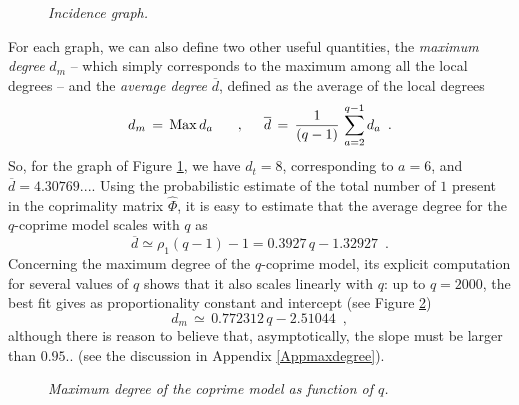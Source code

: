 \documentclass[aps,pra,superscriptaddress]{revtex4}
\newcommand\be            {\begin{equation}}
\newcommand\ee            {\end{equation}}
\renewcommand{\(}{\left(}
\renewcommand{\)}{\right)}
\renewcommand{\[}{\left[}
\renewcommand{\]}{\right]}
\begin{document}
\begin{figure}[t]
\vspace{8mm}
\caption{{\em Incidence graph.}}
\label{incidence}
\end{figure}

For each graph, we can also define two other useful quantities, the {\em maximum degree} $d_m$ -- which simply corresponds to the maximum among all the local degrees -- and the {\em average degree} ${\overline d}$, defined as the average of the local degrees  
\be 
d_m \,=\, {\rm Max} \, d_a \, 
\hspace{5mm}
\,, 
\hspace{5mm}
{\overline d}\,=\,\frac{1}{(q-1)} \, \sum_{a=2}^{q-1} d_a 
\,\,\,.
\label{degrees}
\ee
So, for the graph of Figure \ref{incidence}, we have $d_t = 8$, corresponding to $a=6$, and $\overline d = 4.30769...$. Using the probabilistic estimate of the total number of $1$ present in the coprimality matrix $\widehat\Phi$, it is easy to estimate that the average degree for the $q$-coprime model scales with 
$q$ as 
\be
{\overline d}  \simeq \rho_1 (q-1) -1 = 0.3927 \, q - 1.32927 
\,\,\,.
\label{average}
\ee
Concerning the maximum degree of the $q$-coprime model, its explicit computation for several values of $q$ shows that it also scales linearly 
with $q$: up to $q=2000$, the best fit gives as proportionality constant and intercept (see Figure \ref{maxdegree})
\be
d_m \,\simeq \,  0.772312 \, q - 2.51044 
\,\,\,, 
\label{degreemax}
\ee 
although there is reason to believe that, asymptotically, the slope must be larger than  $0.95.. $ (see the discussion in Appendix  \ref{Appmaxdegree}). 

\begin{figure}[b]
\vspace{8mm}
\caption{{\em Maximum degree of the coprime model as function of $q$.}}
\label{maxdegree}
\end{figure}
\end{document}
